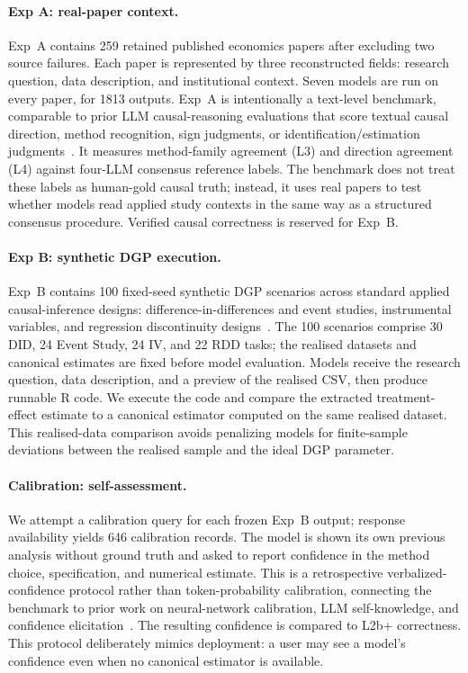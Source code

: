 \documentclass{article}
\begin{document}
\paragraph{Exp A: real-paper context.}
Exp~A contains 259 retained published economics papers after excluding
two source failures. Each paper is represented by three reconstructed
fields: research question, data description, and institutional context.
Seven models are run on every paper, for 1813 outputs. Exp~A is
intentionally a text-level benchmark, comparable to prior LLM
causal-reasoning evaluations that score textual causal direction, method
recognition, sign judgments, or identification/estimation
judgments~\citep{jin2023cladder,jin2024corr2cause,lee2025econcausal,
sawarni2026causalreasoningbenchmark}. It measures method-family agreement
(L3) and direction agreement (L4) against four-LLM consensus reference
labels. The benchmark does not treat these labels as human-gold causal
truth; instead, it uses real papers to test whether models read applied
study contexts in the same way as a structured consensus procedure.
Verified causal correctness is reserved for Exp~B.

\paragraph{Exp B: synthetic DGP execution.}
Exp~B contains 100 fixed-seed synthetic DGP scenarios across standard
applied causal-inference designs: difference-in-differences and event
studies, instrumental variables, and regression discontinuity
designs~\citep{callaway2021did,sun2021eventstudy,mackinlay1997event,
imbens1994identification,angrist1996identification,
thistlethwaite1960regression,imbens2008rdd,lee2010rdd}. The 100 scenarios
comprise 30 DID, 24 Event Study, 24 IV, and 22 RDD tasks; the realised
datasets and canonical estimates are fixed
before model evaluation. Models receive the research question, data
description, and a preview of the realised CSV, then produce runnable R
code. We execute the code and compare the extracted treatment-effect
estimate to a canonical estimator computed on the same realised dataset.
This realised-data comparison avoids penalizing models for finite-sample
deviations between the realised sample and the ideal DGP parameter.

\paragraph{Calibration: self-assessment.}
We attempt a calibration query for each frozen Exp~B output; response
availability yields 646 calibration records. The model is shown its own
previous analysis without ground truth and asked to report confidence in
the method choice, specification, and numerical estimate. This is a
retrospective verbalized-confidence protocol rather than token-probability
calibration, connecting the benchmark to prior work on neural-network
calibration, LLM self-knowledge, and confidence
elicitation~\citep{guo2017calibration,kadavath2022know,
tian2023calibration,xiong2024uncertainty}. The resulting confidence is
compared to L2b+ correctness. This protocol deliberately mimics deployment:
a user may see a model's confidence even when no canonical estimator is
available.
\end{document}
